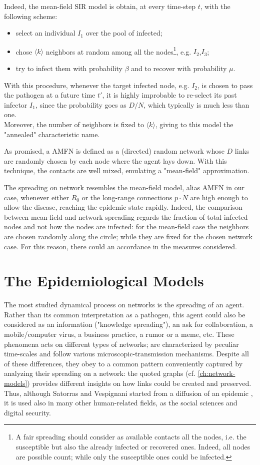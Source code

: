 \documentclass[a4paper,10pt]{book} %
\theoremstyle{definition}
\begin{document}
Indeed, the mean-field SIR model is obtain, at every time-step $t$, with the following scheme: 
\begin{itemize}
	\item select an individual $I_1$ over the pool of infected;
	\item chose $\langle k \rangle$ neighbors at random among all the nodes\footnote{A fair spreading should consider as available contacts all the nodes, i.e. the susceptible but also the already infected or recovered ones. Indeed, all nodes are possible count; while only the susceptible ones could be infected.}, e.g. $I_2$,$I_3$;
	\item try to infect them with probability $\beta$ and to recover with probability $\mu$.
\end{itemize}
With this procedure, whenever the target infected node, e.g. $I_2$, is chosen to pass the pathogen at a future time $t'$, it is highly improbable to re-select its past infector $I_1$, since the probability goes as $D/N$, which typically is much less than one. 
\\Moreover, the number of neighbors is fixed to $\langle k \rangle$, giving to this model the "annealed" characteristic name.

As promised, a AMFN is defined as a (directed) random network whose $D$ links are randomly chosen by each node where the agent lays down. With this technique, the contacts are well mixed, emulating a "mean-field" approximation.

The spreading on network resembles the mean-field model, alias AMFN in our case, whenever either $R_0$ or the long-range connections $p \cdot N$ are high enough to allow the disease, reaching the epidemic state rapidly. Indeed, the comparison between mean-field and network spreading regards the fraction of total infected nodes and not how the nodes are infected: for the mean-field case the neighbors are chosen randomly along the circle; while they are fixed for the chosen network case. For this reason, there could an accordance in the measures considered.



\chapter{The Epidemiological Models}
\label{ch:sir-models}	
The most studied dynamical process on networks is the spreading of an agent. Rather than its common interpretation as a pathogen, this agent could also be considered as an information ("knowledge spreading"), an ask for collaboration, a mobile/computer virus, a business practice, a rumor or a meme, etc. These phenomena acts on different types of networks; are characterized by peculiar time-scales and follow various microscopic-transmission mechanisms. Despite all of these differences, they obey to a common pattern conveniently captured by analyzing their spreading on a network: the quoted graphs (cf. \autoref{ch:network-models}) provides different insights on how links could be created and preserved. Thus, although Satorras and Vespignani started from a diffusion of an epidemic \cite{VespignaniSatorras2001Epidemic}, it is used also in many other human-related fields, as the social sciences and digital security.
\end{document}
